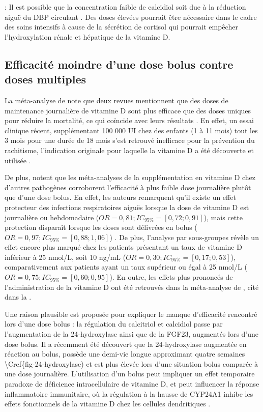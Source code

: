 \documentclass[
  a4paper,
  DIV=11,
  numbers=noendperiod,
  listof=totoc]{scrreprt}
\begin{document}
\textcite{Giustina.2020} : Il est possible que la concentration faible
de calcidiol soit due à la réduction aiguë du \ac{DBP} circulant
\autocite{Christopher.2016}. Des doses élevées pourrait être nécessaire
dans le cadre des soins intensifs à cause de la sécrétion de cortisol
qui pourrait empêcher l'hydroxylation rénale et hépatique de la vitamine
D.

\subsection{Efficacité moindre d'une dose bolus contre doses
multiples}\label{efficacituxe9-moindre-dune-dose-bolus-contre-doses-multiples}

La méta-analyse de \textcite{Meng.2023} note que deux revues mentionnent
que des doses de maintenance journalière de vitamine D sont plus
efficace que des doses uniques pour réduire la mortalité, ce qui
coïncide avec leurs résultats \autocite{Griffin.2021,Mazess.2021}. En
effet, un essai clinique récent, supplémentant 100 000 UI chez des
enfants (1 à 11 mois) tout les 3 mois pour une durée de 18 mois s'est
retrouvé inefficace pour la prévention du rachitisme, l'indication
originale pour laquelle la vitamine D a été découverte et utilisée
\autocite{Crowe.2021}.

De plus, \textcite{Griffin.2021} notent que les méta-analyses de la
supplémentation en vitamine D chez d'autres pathogènes corroborent
l'efficacité à plus faible dose journalière plutôt que d'une dose bolus.
En effet, les auteurs remarquent qu'il existe un effet protecteur des
infections respiratoires aiguës lorsque la dose de vitamine D est
journalière ou hebdomadaire (\(OR = 0,81 ; IC_{95\%} = [0,72 ; 0,91]\)),
mais cette protection disparaît lorsque les doses sont délivrées en
bolus (\(OR = 0,97 ; IC_{95\%} = [0,88 ; 1,06]\))
\autocite{Martineau.2017}. De plus, l'analyse par sous-groupes révèle un
effet encore plus marqué chez les patients présentant un taux de
vitamine D inférieur à 25 nmol/L, soit 10 ng/mL
(\(OR = 0,30 ; IC_{95\%} = [0,17 ; 0,53]\)), comparativement aux
patients ayant un taux supérieur ou égal à 25 nmol/L
(\(OR = 0,75 ; IC_{95\%} = [0,60 ; 0,95]\)). En outre, les effets plus
prononcés de l'administration de la vitamine D ont été retrouvés dans la
méta-analyse de \textcite{Yang.2024}, cité dans la
.

Une raison plausible est proposée pour expliquer le manque d'efficacité
rencontré lors d'une dose bolus : la régulation du calcitriol et
calcidiol passe par l'augmentation de la 24-hydroxylase ainsi que de la
\ac{FGF23}, augmentés lors d'une dose bolus. Il a récemment été
découvert que la 24-hydroxylase augmentée en réaction au bolus, possède
une demi-vie longue approximant quatre semaines
\textbackslash Cref\{fig-24-hydroxylase) et est plus élevée lors d'une
situation bolus comparée à une dose journalière. L'utilisation d'un
bolus peut impliquer un effet temporaire paradoxe de déficience
intracellulaire de vitamine D, et peut influencer la réponse
inflammatoire immunitaire, où la régulation à la hausse de CYP24A1
inhibe les effets fonctionnels de la vitamine D chez les cellules
dendritiques \autocite{Griffin.2021,Ketha.2018}.
\end{document}

